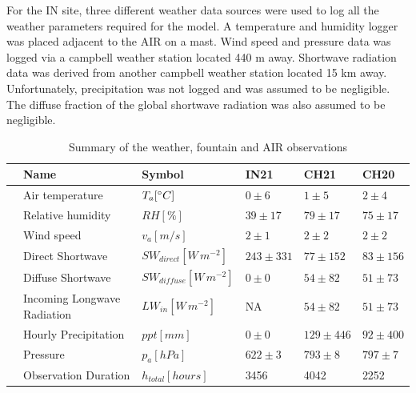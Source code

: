 \documentclass[utf8]{frontiersSCNS} %
\begin{document}
For the IN site, three different weather data sources were used to log all the weather parameters required for the
model. A temperature and humidity logger was placed adjacent to the AIR on a mast. Wind speed and pressure data was logged via a campbell weather station located 440 m away. Shortwave radiation data was derived from another campbell weather station located 15 km away. Unfortunately, precipitation was not logged and was assumed to be negligible. The diffuse fraction of the global shortwave radiation was also assumed to be negligible.

\begin{table}
	\centering
	\caption{ Summary of the weather, fountain and AIR observations}
	\label{tab:Observations}
	\begin{tabular}{@{}|llllll|@{}}
		\toprule
		\textbf{}              & \textbf{Name}               & \textbf{Symbol}           & \textbf{IN21} & \textbf{CH21} & \textbf{CH20} \\ \midrule
		\multicolumn{1}{|l|}{\multirow{9}{*}{\rotatebox[origin=c]{90}{Weather}}}
		                       & Air temperature             & $T_a [\degree C]    $     & $0 \pm 6$     & $1 \pm 5$     & $2 \pm 4$     \\
		\multicolumn{1}{|l|}{} & Relative humidity           & $RH  [\%]        $        & $39 \pm 17$   & $79 \pm 17$   & $75 \pm 17$   \\
		\multicolumn{1}{|l|}{} & Wind speed                  & $v_a [m/s]        $       & $2 \pm 1$     & $2 \pm 2$     & $2 \pm 2$     \\
		\multicolumn{1}{|l|}{} & Direct Shortwave            & $SW_{direct} [W\,m^{-2}]$ & $243 \pm 331$ & $77 \pm 152$  & $83 \pm 156$  \\
		\multicolumn{1}{|l|}{} & Diffuse Shortwave           & $SW_{diffuse}[W\,m^{-2}]$ & $0 \pm 0$     & $54 \pm82$    & $51 \pm 73$   \\
		\multicolumn{1}{|l|}{} & Incoming Longwave Radiation & $LW_{in}[W\,m^{-2}]$      & NA            & $54 \pm82$    & $51 \pm 73$   \\
		\multicolumn{1}{|l|}{} & Hourly Precipitation        & $ppt [mm]       $         & $0 \pm 0$     & $129 \pm 446$ & $92 \pm 400$  \\
		\multicolumn{1}{|l|}{} & Pressure                    & $p_a [hPa]        $       & $622 \pm 3$   & $793 \pm 8$   & $797 \pm7$    \\
		\multicolumn{1}{|l|}{} & Observation Duration        & $h_{total} [hours]$       & 3456          & 4042          & 2252          \\\bottomrule

\end{tabular}
\end{table}
\end{document}
